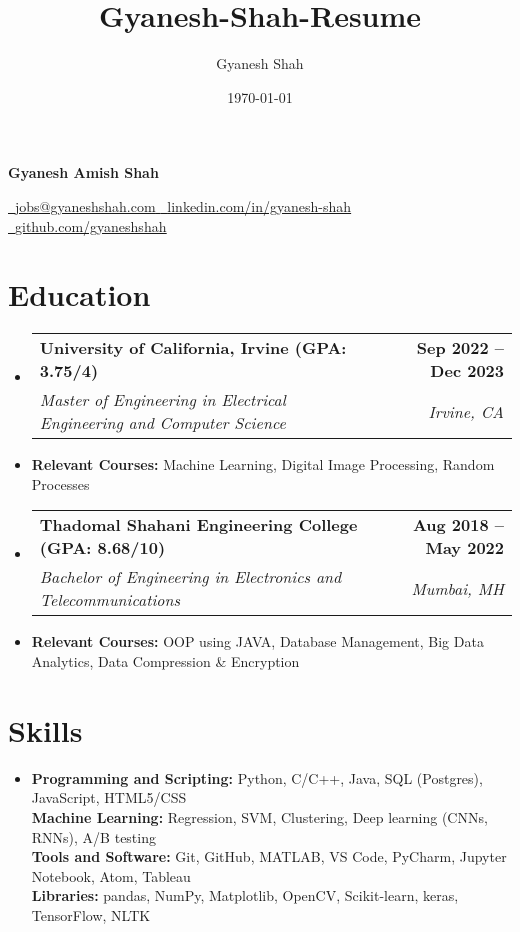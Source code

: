 \documentclass[letterpaper,11pt]{article}
\title{Gyanesh-Shah-Resume}
\author{Gyanesh Shah}
\date{\today}
\makeatletter
\newcommand{\resumeSubheading}[4]{
  \vspace{-2pt}\item
    \begin{tabular*}{1.0\textwidth}[t]{l@{\extracolsep{\fill}}r}
      \textbf{#1} & \textbf{\small #2} \\
      \textit{\small#3} & \textit{\small #4} \\
    \end{tabular*}\vspace{-7pt}
}
\newcommand{\resumeSubHeadingListStart}{\begin{itemize}[leftmargin=0.0in, label={}]}
\newcommand{\resumeSubHeadingListEnd}{\end{itemize}}
\makeatother
\begin{document}
\begin{center}
    \textbf{\Huge Gyanesh Amish Shah} \\ \vspace{-5pt}
\end{center}

\begin{center}
    \href{mailto:jobs@gyaneshshah.com}{\hspace{-0.5em} \ \small \underline{jobs@gyaneshshah.com} \quad} %
    \href{https://www.linkedin.com/in/gyanesh-shah/}{\hspace{-0.5em} \ \small \underline{linkedin.com/in/gyanesh-shah} \quad} %
    \href{https://github.com/gyaneshshah}{\hspace{-0.5em} \ \small \underline{github.com/gyaneshshah} \quad} %
\end{center}

\section{Education}
    \resumeSubHeadingListStart
        \resumeSubheading
            {University of California, Irvine (GPA: 3.75/4)}{Sep 2022 -- Dec 2023} 
            {Master of Engineering in Electrical Engineering and Computer Science}{Irvine, CA}
            \item{
            {\small\textbf{Relevant Courses:}{ Machine Learning, Digital Image Processing, Random Processes}
            }}
        \resumeSubheading
            {Thadomal Shahani Engineering College (GPA: 8.68/10)}{Aug 2018 -- May 2022}
            {Bachelor of Engineering in Electronics and Telecommunications}{Mumbai, MH}
            \item{
            {\small\textbf{Relevant Courses:}{ OOP using JAVA, Database Management, Big Data Analytics, Data Compression \& Encryption}
            }}

    \resumeSubHeadingListEnd

\section{Skills}
 \resumeSubHeadingListStart
   \item{
     \textbf{Programming and Scripting:}{ Python, C/C++, Java, SQL (Postgres), JavaScript, HTML5/CSS} \\
     \textbf{Machine Learning:}{ Regression, SVM, Clustering, Deep learning (CNNs, RNNs), A/B testing} \\
     \textbf{Tools and Software:}{ Git, GitHub, MATLAB, VS Code, PyCharm, Jupyter Notebook, Atom, Tableau} \\
     \textbf{Libraries:}{ pandas, NumPy, Matplotlib, OpenCV, Scikit-learn, keras, TensorFlow, NLTK}
   }
 \resumeSubHeadingListEnd
\end{document}
